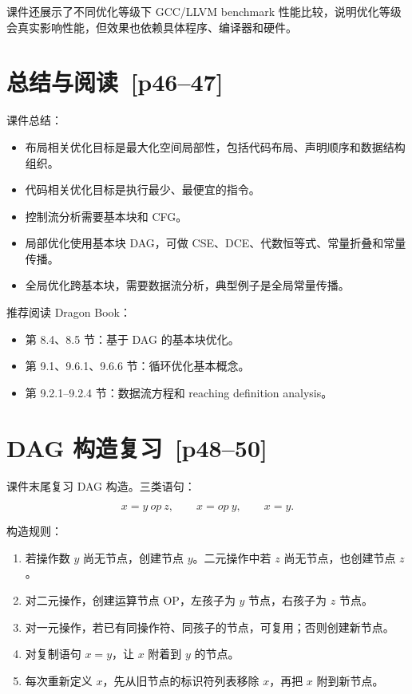 \documentclass[UTF8,fontset=none,11pt]{ctexart}
\newcommand{\pg}[1]{\texorpdfstring{{\small\color{graytext}\,[p#1]}}{ [p#1]}}
\begin{document}
课件还展示了不同优化等级下 GCC/LLVM benchmark 性能比较，说明优化等级会真实影响性能，但效果也依赖具体程序、编译器和硬件。

\section{总结与阅读 \pg{46--47}}

课件总结：

\begin{itemize}
  \item 布局相关优化目标是最大化空间局部性，包括代码布局、声明顺序和数据结构组织。
  \item 代码相关优化目标是执行最少、最便宜的指令。
  \item 控制流分析需要基本块和 CFG。
  \item 局部优化使用基本块 DAG，可做 CSE、DCE、代数恒等式、常量折叠和常量传播。
  \item 全局优化跨基本块，需要数据流分析，典型例子是全局常量传播。
\end{itemize}

推荐阅读 Dragon Book：

\begin{itemize}
  \item 第 8.4、8.5 节：基于 DAG 的基本块优化。
  \item 第 9.1、9.6.1、9.6.6 节：循环优化基本概念。
  \item 第 9.2.1--9.2.4 节：数据流方程和 reaching definition analysis。
\end{itemize}

\section{DAG 构造复习 \pg{48--50}}

课件末尾复习 DAG 构造。三类语句：

\[
x=y\ op\ z,\qquad x=op\ y,\qquad x=y.
\]

构造规则：

\begin{enumerate}
  \item 若操作数 \(y\) 尚无节点，创建节点 \(y\)。二元操作中若 \(z\) 尚无节点，也创建节点 \(z\)。
  \item 对二元操作，创建运算节点 OP，左孩子为 \(y\) 节点，右孩子为 \(z\) 节点。
  \item 对一元操作，若已有同操作符、同孩子的节点，可复用；否则创建新节点。
  \item 对复制语句 \(x=y\)，让 \(x\) 附着到 \(y\) 的节点。
  \item 每次重新定义 \(x\)，先从旧节点的标识符列表移除 \(x\)，再把 \(x\) 附到新节点。
\end{enumerate}
\end{document}
